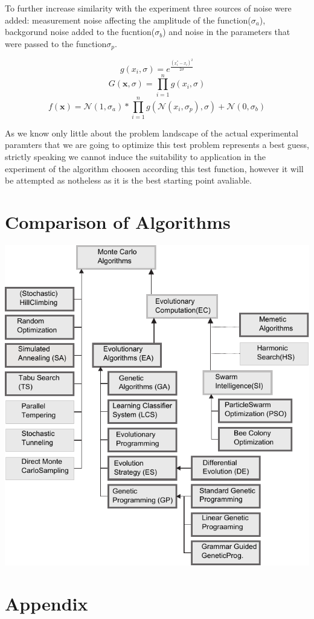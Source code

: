 \documentclass[a4paper,titlepage]{report}
\begin{document}
To further increase similarity with the experiment three sources of noise were added: measurement noise affecting the amplitude of the function($\sigma_a$), backgorund noise added to the fucntion($\sigma_b$) and noise in the parameters that were passed to the function$\sigma_p$. 

\[g(x_i,\sigma) = e^{\frac{(x_i^*-x_i)^2}{2\sigma}}\]
\[G(\mathbf{x},\sigma) = \prod_{i=1}^n g(x_i, \sigma)\]
\[f(\mathbf{x}) =  \mathcal{N}(1,\sigma_a) * \prod_{i=1}^n g(\mathcal{N}(x_i,\sigma_p), \sigma) + \mathcal{N}(0,\sigma_b) \]

As we know only little about the problem landscape of the actual experimental paramters that we are going to optimize this test problem represents a best guess, strictly speaking we cannot induce the suitability to application in the experiment of the algorithm choosen according this test function, however it will be attempted as notheless as it is the best starting point avaliable.


\section{Comparison of Algorithms}




\newpage
\includegraphics{Images/taxonomy_v2.pdf}

\section{Appendix}
\end{document}
